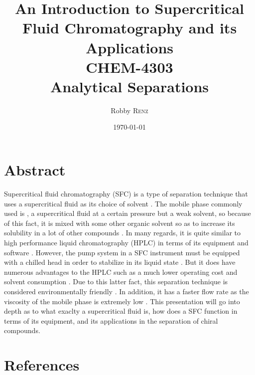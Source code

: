 \documentclass[a4paper, 12pt]{article}
\title{An Introduction to Supercritical Fluid Chromatography and its Applications \\ CHEM-4303 \\ Analytical Separations} %
\author{Robby \textsc{Renz}} %
\date{\today} %
\begin{document}
\maketitle %


\section{Abstract}
Supercritical fluid chromatography (SFC) is a type of separation technique that uses a supercritical fluid as its choice of solvent \cite{harris}. The mobile phase commonly used is , a supercritical fluid at a certain pressure but a weak solvent, so because of this fact, it is mixed with some other organic solvent so as to increase its solubility in a lot of other compounds \cite{harris}. In many regards, it is quite similar to high performance liquid chromatography (HPLC) in terms of its equipment and software \cite{taylor_supercritical_2010}. However, the pump system in a SFC instrument must be equipped with a chilled head in order to stabilize  in its liquid state \cite{taylor_supercritical_2010}. But it does have numerous advantages to the HPLC such as a much lower operating cost and solvent consumption \cite{taylor_supercritical_2010}. Due to this latter fact, this separation technique is considered environmentally friendly \cite{harris}. In addition, it has a faster flow rate as the viscosity of the mobile phase is extremely low \cite{harris}. This presentation will go into depth as to what exaclty a supercritical fluid is, how does a SFC function in terms of its equipment, and its applications in the separation of chiral compounds.



\section{References}
\printbibliography

\end{document}
